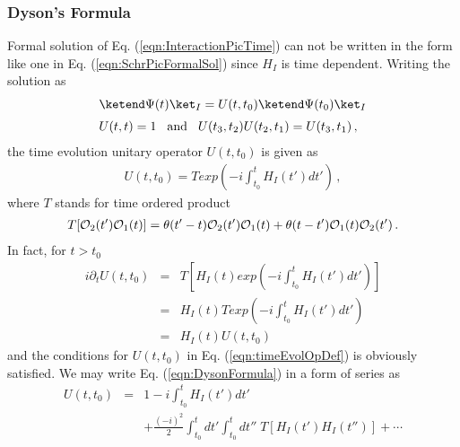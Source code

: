 \subsubsection{Dyson's Formula}
Formal solution of Eq. (\ref{eqn:InteractionPicTime}) 
can not be written in the form like one in Eq. (\ref{eqn:SchrPicFormalSol})
since $H_I$ is time dependent.
Writing the solution as
\begin{eqnarray}
\begin{array}{l}
\ketend \Psi(t) \ket_I
=
U(t,t_0)
\ketend \Psi(t_0) \ket_I
\vspace{2mm}
\\
U(t,t) = 1
\hspace{3mm} \mbox{and}
\hspace{3mm}
 U(t_3,t_2) U(t_2,t_1) = U(t_3,t_1) \,,
\end{array}
\label{eqn:timeEvolOpDef}
\end{eqnarray}
the time evolution unitary operator $U(t,t_0)$ is given as
\begin{eqnarray}
U(t, t_0) =
T exp \left(
-i \int_{t_0}^t H_I (t') dt'
\right)\,,
\label{eqn:DysonFormula}
\end{eqnarray}
where $T$ stands for time ordered product 
\cite{ref:Peskin-Schroeder, ref:Itzykson-Zuber, ref:NIsh.1-2, ref:Hioki, ref:Tong}
\begin{eqnarray}
T[ {\cal O}_2(t')  {\cal O}_1 (t) ]=
\theta(t' - t) {\cal O}_2(t')  {\cal O}_1 (t) +
\theta(t - t'){\cal O}_1(t)  {\cal O}_2 (t') \,.
\label{eqn:TProdDef}
\end{eqnarray}
In fact, for $t > t_0$
\begin{eqnarray}
i\partial_t U(t, t_0)
&=&
T \left[
H_I(t) 
 exp \left(
-i \int_{t_0}^t H_I (t') dt'
\right)
\right]
\nonumber\\
&=&
H_I(t) 
T exp \left(
-i \int_{t_0}^t H_I (t') dt'
\right)
\nonumber\\
&=&
H_I(t) 
U(t, t_0)
\end{eqnarray}
and the conditions for $U(t, t_0)$ in Eq. (\ref{eqn:timeEvolOpDef})
is obviously satisfied.
We may write Eq. (\ref{eqn:DysonFormula}) in a form of series as
\begin{eqnarray}
U(t, t_0) &=&
1 -i \int_{t_0}^t H_I (t') dt'
\nonumber\\
&&+
\frac{(-i)^2}{2}
\int_{t_0}^t dt'
\int_{t_0}^t dt''
\;T[ H_I (t') H_I (t'')]
+ \cdots
\label{eqn:TimeDevPerturbSerTprod}
\end{eqnarray}

